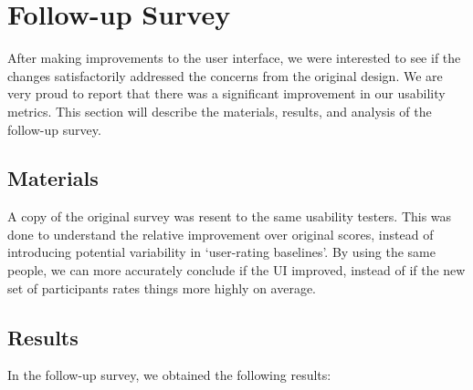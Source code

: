 \documentclass[12pt, titlepage]{article}
\begin{document}
\section{Follow-up Survey}
After making improvements to the user interface, we were interested to see if the changes satisfactorily addressed the concerns from the original design. 
We are very proud to report that there was a significant improvement in our usability metrics. This section will describe the materials, results, and analysis of the follow-up survey.

\subsection{Materials}
A copy of the original survey was resent to the same usability testers. This was done to understand the relative improvement over original scores, instead of introducing
potential variability in `user-rating baselines'. By using the same people, we can more accurately conclude if the UI improved, instead of if the new set of participants rates things more highly on average.
\subsection{Results}
In the follow-up survey, we obtained the following results:
\end{document}
